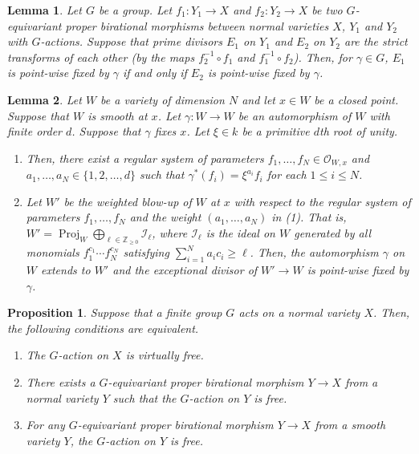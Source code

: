 \documentclass[10pt,a4paper]{amsart}
\newtheorem{lem}{Lemma}
\newtheorem{prop}{Proposition}
\begin{document}
\begin{lem}\label{lem:model_change}
Let $G$ be a group. Let $f_1: Y_1 \to X$ and $f_2: Y_2 \to X$ be two $G$-equivariant proper birational morphisms between normal varieties $X$, $Y_1$ and $Y_2$ with $G$-actions. 
Suppose that prime divisors $E_1$ on $Y_1$ and $E_2$ on $Y_2$ are the strict transforms of each other (by the maps $f_2 ^{-1} \circ f_1$ and $f_1 ^{-1} \circ f_2$). 
Then, for $\gamma \in G$, $E_1$ is point-wise fixed by $\gamma$ if and only if $E_2$ is point-wise fixed by $\gamma$. 
\end{lem}

\begin{lem}\label{lem:wb}
Let $W$ be a variety of dimension $N$ and let $x \in W$ be a closed point. 
Suppose that $W$ is smooth at $x$. 
Let $\gamma : W \to W$ be an automorphism of $W$ with finite order $d$. 
Suppose that $\gamma$ fixes $x$. 
Let $\xi \in k$ be a primitive $d$th root of unity. 
\begin{enumerate}
\item
Then, there exist a regular system of parameters $f_1, \ldots , f_{N} \in \mathcal{O}_{W, x}$ and $a_1, \ldots , a_N \in \{ 1, 2 , \ldots , d \}$ such that 
$\gamma ^* (f_i) = \xi ^{a_i}  f_i$ for each $1 \le i \le N$. 

\item
Let $W'$ be the weighted blow-up of $W$ at $x$ with respect to the regular system of parameters $f_1, \ldots , f_{N}$ and the weight $(a_1, \ldots, a_N)$ in (1). 
That is, $W'=\operatorname{Proj}_W \bigoplus_{\ell \in \mathbb{Z}_{\ge 0}} \mathcal{I}_{\ell} $, where $\mathcal{I}_{\ell}$ is the ideal on $W$ generated by all monomials $f_1^{c_1}\cdots f_{N}^{c_N}$ satisfying $\sum_{i=1}^N a_i c_i \ge \ell$.
Then, the automorphism $\gamma$ on $W$ extends to $W'$ and the exceptional divisor of $W' \to W$ is point-wise fixed by $\gamma$. 
\end{enumerate}
\end{lem}

\begin{prop}\label{prop:char}
Suppose that a finite group $G$ acts on a normal variety $X$. 
Then, the following conditions are equivalent. 
\begin{enumerate}
\item 
The $G$-action on $X$ is virtually free. 

\item
There exists a $G$-equivariant proper birational morphism $Y \to X$ from a normal variety $Y$ such that the $G$-action on $Y$ is free.  

\item
For any $G$-equivariant proper birational morphism $Y \to X$ from a smooth variety $Y$, the $G$-action on $Y$ is free. 
\end{enumerate}
\end{prop}
\end{document}
